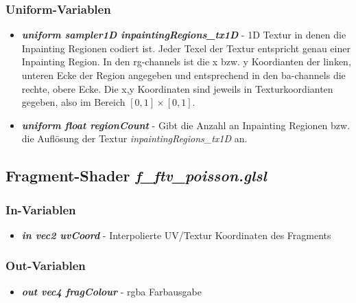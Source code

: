 \documentclass[10pt,a4paper,notitlepage]{article}
\begin{document}
\subsubsection*{Uniform-Variablen}
\begin{itemize}
\item \textbf{\textit{uniform sampler1D inpaintingRegions\_tx1D}} - 1D Textur in denen die Inpainting Regionen codiert ist. Jeder Texel der Textur entspricht genau einer Inpainting Region. In den rg-channels ist die x bzw. y Koordianten der linken, unteren Ecke der Region angegeben und entsprechend in den ba-channels die rechte, obere Ecke. Die x,y Koordinaten sind jeweils in Texturkoordianten gegeben, also im Bereich $[0,1]\times[0,1]$.
\item \textbf{\textit{uniform float regionCount}} - Gibt die Anzahl an Inpainting Regionen bzw. die Auflösung der Textur \textit{inpaintingRegions\_tx1D} an.
\end{itemize}

\subsection{Fragment-Shader \textit{f\_ftv\_poisson.glsl}}
\subsubsection*{In-Variablen}
\begin{itemize}
\item \textbf{\textit{in vec2 uvCoord}} - Interpolierte UV/Textur Koordinaten des Fragments
\end{itemize}
\subsubsection*{Out-Variablen}
\begin{itemize}
\item \textbf{\textit{out vec4 fragColour}} - rgba Farbausgabe
\end{itemize}
\end{document}
